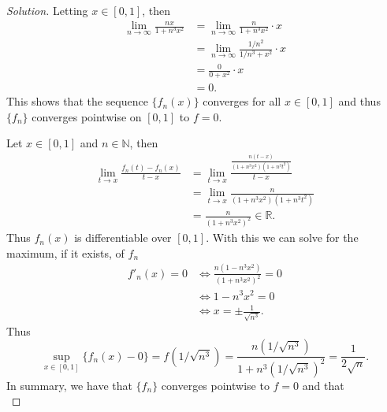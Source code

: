 \documentclass[12pt]{article}
\newenvironment{solution}
{\renewcommand\qedsymbol{$\blacksquare$}\begin{proof}[Solution]}
{\end{proof}}
\begin{document}
\begin{enumerate}
\begin{equation*}
            \end{equation*}
            \begin{solution}
                Letting $x\in[0, 1]$, then 
                \begin{align*}
                    \lim_{n\to\infty}\frac{nx}{1+n^3x^2} &=
                    \lim_{n\to\infty}\frac{n}{1+n^3x^2}\cdot x \\
                    &=\lim_{n\to\infty}\frac{1/n^2}{1/n^3+x^2}\cdot x \\
                    &=\frac{0}{0+x^2}\cdot x \\
                    &= 0.
                \end{align*}
                This shows that the sequence $\{f_n(x)\}$ converges for all
                $x\in[0, 1]$ and thus $\{f_n\}$ converges pointwise on $[0,
                1]$ to $f=0$.\par\hspace{4mm} Let $x\in[0, 1]$ and $n\in\mathbb{N}$, then 
                \begin{align*}
                    \lim_{t\to x}\frac{f_n(t)-f_n(x)}{t-x} &=
                    \lim_{t\to x}\frac{\frac{n(t-x)}{(1+n^3x^2)(1+n^3t^2)}}{t-x} \\
                    &=\lim_{t\to x}\frac{n}{(1+n^3x^2)(1+n^3t^2)} \\
                    &=\frac{n}{(1+n^3x^2)^2}\in\mathbb{R}.
                \end{align*}
                Thus $f_n(x)$ is differentiable over $[0, 1]$. With this we can
                solve for the maximum, if it exists, of $f_n$
                \begin{align*}
                    f'_n(x)=0 &\Leftrightarrow
                    \frac{n(1-n^3x^2)}{(1+n^3x^2)^2}=0 \\
                    &\Leftrightarrow 1-n^3x^2=0 \\
                    &\Leftrightarrow x=\pm\frac{1}{\sqrt{n^3}}.
                \end{align*}
                Thus 
                \begin{equation*}
                    \sup_{x\in[0,
                    1]}\{f_n(x)-0\}=f(1/\sqrt{n^3})
                    =\frac{n(1/\sqrt{n^3})}{1+n^3(1/\sqrt{n^3})^2}
                    =\frac{1}{2\sqrt{n}}.
                \end{equation*}
                In summary, we have that $\{f_n\}$ converges pointwise to $f=0$
                and that
                \begin{equation*}

\end{equation*}
\end{solution}
\end{enumerate}
\end{document}
